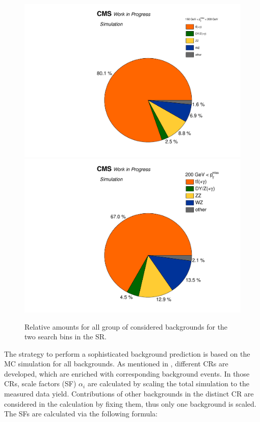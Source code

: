 \begin{figure}[htb]
 \centering
 \includegraphics[width=\pairwidth]{figures/figures/pie1}
 \includegraphics[width=\pairwidth]{figures/figures/pie2}
 \caption{Relative amounts for all group of considered backgrounds for the two search bins in the SR.}
 \label{fig:PieCharts}
\end{figure}
The strategy to perform a sophisticated background prediction is based on the MC simulation for all backgrounds. As mentioned in , different CRs are developed, which are enriched with corresponding background events. In those CRs, scale factors (SF) $\alpha_i$ are calculated by scaling the total simulation to the measured data yield. Contributions of other backgrounds in the distinct CR are considered in the calculation by fixing them, thus only one background is scaled. The SFs are calculated via the following formula:
